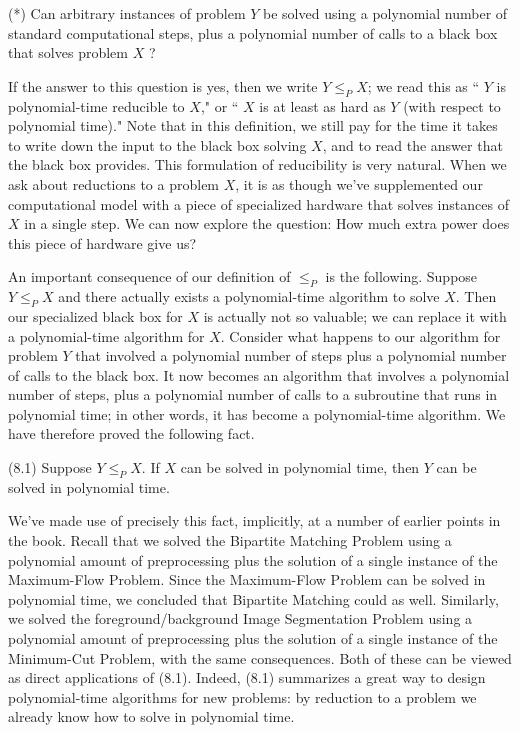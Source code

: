 \documentclass[a4paper, 12pt]{book}
\theoremstyle{dotless}
\begin{document}
(*) Can arbitrary instances of problem $Y$ be solved using a polynomial number of standard computational steps, plus a polynomial number of calls to a black box that solves problem $X$ ?

If the answer to this question is yes, then we write $Y \leq_{P} X$; we read this as `` $Y$ is polynomial-time reducible to $X$," or `` $X$ is at least as hard as $Y$ (with respect to polynomial time)." Note that in this definition, we still pay for the time it takes to write down the input to the black box solving $X$, and to read the answer that the black box provides. This formulation of reducibility is very natural. When we ask about reductions to a problem $X$, it is as though we've supplemented our computational model with a piece of specialized hardware that solves instances of $X$ in a single step. We can now explore the question: How much extra power does this piece of hardware give us?

An important consequence of our definition of $\leq_{P}$ is the following. Suppose $Y \leq_{P} X$ and there actually exists a polynomial-time algorithm to solve $X$. Then our specialized black box for $X$ is actually not so valuable; we can replace it with a polynomial-time algorithm for $X$. Consider what happens to our algorithm for problem $Y$ that involved a polynomial number of steps plus a polynomial number of calls to the black box. It now becomes an algorithm that involves a polynomial number of steps, plus a polynomial number of calls to a subroutine that runs in polynomial time; in other words, it has become a polynomial-time algorithm. We have therefore proved the following fact.

(8.1) Suppose $Y \leq_{P} X$. If $X$ can be solved in polynomial time, then $Y$ can be solved in polynomial time.

We've made use of precisely this fact, implicitly, at a number of earlier points in the book. Recall that we solved the Bipartite Matching Problem using a polynomial amount of preprocessing plus the solution of a single instance of the Maximum-Flow Problem. Since the Maximum-Flow Problem can be solved in polynomial time, we concluded that Bipartite Matching could as well. Similarly, we solved the foreground/background Image Segmentation Problem using a polynomial amount of preprocessing plus the solution of a single instance of the Minimum-Cut Problem, with the same consequences. Both of these can be viewed as direct applications of (8.1). Indeed, (8.1) summarizes a great way to design polynomial-time algorithms for new problems: by reduction to a problem we already know how to solve in polynomial time.
\end{document}
